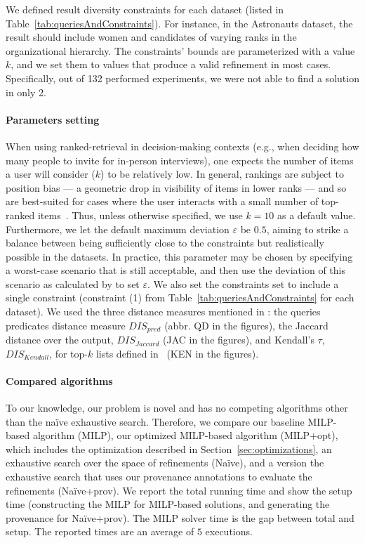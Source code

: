      
     
     We defined result diversity constraints for each dataset (listed in Table~\ref{tab:queriesAndConstraints}). For instance, in the Astronauts dataset, the result should include women and candidates of varying ranks in the organizational hierarchy. The constraints' bounds are parameterized with a value $k$, and we set them to values that produce a valid refinement in most cases. Specifically, out of 132 performed experiments, we were not able to find a solution in only 2. 
     

 


\paragraph*{\textbf{Parameters setting}} When using ranked-retrieval in decision-making contexts (e.g., when deciding how many people to invite for in-person interviews), one expects the number of items a user will consider ($k$) to be relatively low. In general, rankings are subject to position bias --- a geometric drop in visibility of items in lower ranks --- and so are best-suited for cases where the user interacts with a small number of top-ranked items~\cite{DBLP:journals/cacm/Baeza-Yates18}.
Thus, unless otherwise specified, we use $k=10$ as a default value. Furthermore, we let the default maximum deviation $\varepsilon$ be $0.5$, aiming to strike a balance between being sufficiently close to the constraints but realistically possible in the datasets. In practice, this parameter may be chosen by specifying a worst-case scenario that is still acceptable, and then use the deviation of this scenario as calculated by  to set $\varepsilon$. We also set the constraints set to include a single constraint (constraint (1) from Table~\ref{tab:queriesAndConstraints} for each dataset). We used the three distance measures mentioned in : the queries predicates distance measure $DIS_{pred}$ (abbr. QD in the figures), the Jaccard distance over the output, $DIS_{Jaccard}$ (JAC in the figures), and Kendall's $\tau$, $DIS_{Kendall}$, for top-$k$ lists defined in~\cite{FKS03} (KEN in the figures). 





\paragraph*{\textbf{Compared algorithms}}
To our knowledge, our problem is novel and has no competing algorithms other than the na\"{i}ve exhaustive search. Therefore, we compare our baseline MILP-based algorithm (MILP), our optimized MILP-based algorithm (MILP+opt), which includes the optimization described in Section~\ref{sec:optimizations}, an exhaustive search over the space of refinements (Na\"{i}ve), and a version the exhaustive search that uses our provenance annotations to evaluate the refinements (Na\"{i}ve+prov). 
We report the total running time and show the setup time (constructing the MILP for MILP-based solutions, and generating the provenance for Na\"{i}ve+prov). The MILP solver time is the gap between total and setup.
The reported times are an average of $5$ executions.

